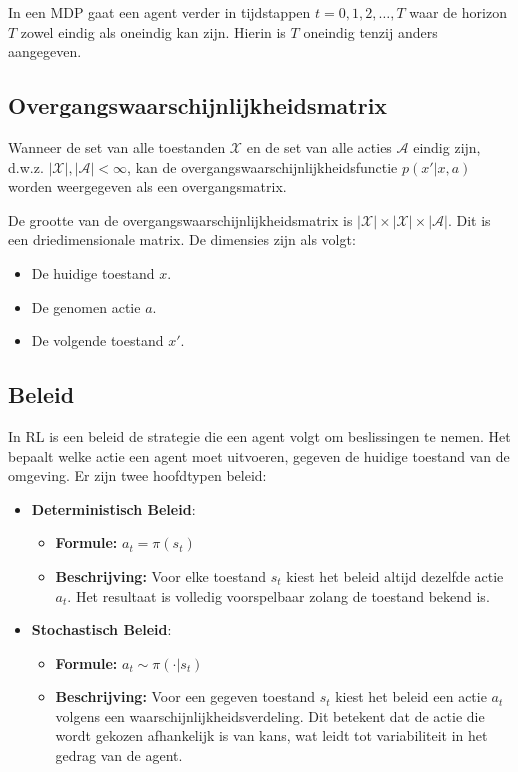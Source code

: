 \documentclass[a4paper,12pt]{report}
\begin{document}
In een MDP gaat een agent verder in tijdstappen \(t = 0, 1, 2, \ldots, T\) waar
de horizon \(T\) zowel eindig als oneindig kan zijn. Hierin is \(T\) oneindig
tenzij anders aangegeven.

\subsection*{Overgangswaarschijnlijkheidsmatrix}

Wanneer de set van alle toestanden \(\mathcal{X}\) en de set van alle acties
\(\mathcal{A}\) eindig zijn, d.w.z. \(|\mathcal{X}|, |\mathcal{A}| < \infty\),
kan de overgangswaarschijnlijkheidsfunctie \(p(x'|x,a)\) worden weergegeven als
een overgangsmatrix.

De grootte van de overgangswaarschijnlijkheidsmatrix is \(|\mathcal{X}| \times
|\mathcal{X}| \times |\mathcal{A}|\). Dit is een driedimensionale matrix. De
dimensies zijn als volgt:
\begin{itemize}
    \item De huidige toestand \(x\).
    \item De genomen actie \(a\).
    \item De volgende toestand \(x'\).
\end{itemize}

\subsection*{Beleid}

In RL is een beleid de strategie die een agent volgt om beslissingen te nemen.
Het bepaalt welke actie een agent moet uitvoeren, gegeven de huidige toestand
van de omgeving. Er zijn twee hoofdtypen beleid:

\begin{itemize}
    \item \textbf{Deterministisch Beleid}:
          \begin{itemize}
              \item \textbf{Formule:} \(a_t = \pi(s_t)\)
              \item \textbf{Beschrijving:} Voor elke toestand \(s_t\) kiest het beleid altijd dezelfde actie \(a_t\). Het resultaat is volledig voorspelbaar zolang de toestand bekend is.
          \end{itemize}

    \item \textbf{Stochastisch Beleid}:
          \begin{itemize}
              \item \textbf{Formule:} \(a_t \sim \pi(\cdot|s_t)\)
              \item \textbf{Beschrijving:} Voor een gegeven toestand \(s_t\) kiest het beleid een actie \(a_t\) volgens een waarschijnlijkheidsverdeling. Dit betekent dat de actie die wordt gekozen afhankelijk is van kans, wat leidt tot variabiliteit in het gedrag van de agent.
          \end{itemize}
\end{itemize}
\end{document}
